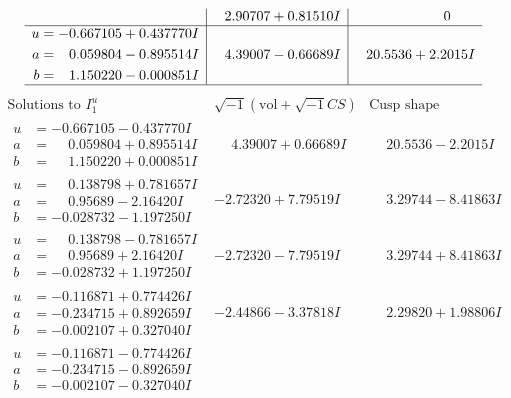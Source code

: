 \documentclass[1p]{elsarticle_modified}
\theoremstyle{definition}
\newcommand{\I}{\sqrt{-1}}
\begin{document}
$$\begin{array}{c|c|c}
 & \phantom{-}2.90707 + 0.81510 I & \phantom{-0.000000 } 0 \\ \hline\begin{aligned}
u &= -0.667105 + 0.437770 I \\
a &= \phantom{-}0.059804 - 0.895514 I \\
b &= \phantom{-}1.150220 - 0.000851 I\end{aligned}
 & \phantom{-}4.39007 - 0.66689 I & \phantom{-}20.5536 + 2.2015 I\\
 \hline 
 \end{array}$$\newpage$$\begin{array}{c|c|c}  
\text{Solutions to }I^u_{1}& \I (\text{vol} + \sqrt{-1}CS) & \text{Cusp shape}\\
 \hline 
\begin{aligned}
u &= -0.667105 - 0.437770 I \\
a &= \phantom{-}0.059804 + 0.895514 I \\
b &= \phantom{-}1.150220 + 0.000851 I\end{aligned}
 & \phantom{-}4.39007 + 0.66689 I & \phantom{-}20.5536 - 2.2015 I \\ \hline\begin{aligned}
u &= \phantom{-}0.138798 + 0.781657 I \\
a &= \phantom{-}0.95689 - 2.16420 I \\
b &= -0.028732 - 1.197250 I\end{aligned}
 & -2.72320 + 7.79519 I & \phantom{-}3.29744 - 8.41863 I \\ \hline\begin{aligned}
u &= \phantom{-}0.138798 - 0.781657 I \\
a &= \phantom{-}0.95689 + 2.16420 I \\
b &= -0.028732 + 1.197250 I\end{aligned}
 & -2.72320 - 7.79519 I & \phantom{-}3.29744 + 8.41863 I \\ \hline\begin{aligned}
u &= -0.116871 + 0.774426 I \\
a &= -0.234715 + 0.892659 I \\
b &= -0.002107 + 0.327040 I\end{aligned}
 & -2.44866 - 3.37818 I & \phantom{-}2.29820 + 1.98806 I \\ \hline\begin{aligned}
u &= -0.116871 - 0.774426 I \\
a &= -0.234715 - 0.892659 I \\
b &= -0.002107 - 0.327040 I\end{aligned}

\end{array}$$
\end{document}

